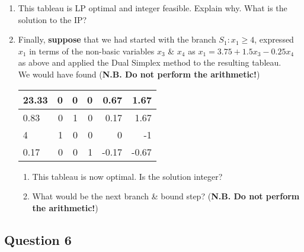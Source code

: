\documentclass[12pt]{article}
\begin{document}
\begin{itemize}
\begin{enumerate}[(i)]
\begin{enumerate}
				\item This tableau is LP optimal and integer feasible. Explain why. What is the solution to the IP?
				\item Finally, {\bf suppose} that we had started with the branch $S_1: x_1 \ge 4$, expressed  $x_1$ in terms of the non-basic variables $x_3$ \& $x_4$ as $x_1 =3.75+1.5 x_3 -0.25 x_4$ as above and applied the Dual Simplex method to the resulting tableau.\\
				\smallskip
				We would have found  ({\bf N.B. Do not perform the arithmetic!})
				\begin{center}
				\begin{tabular}[h]{|l|rrrrr|}\hline
					23.33       &      0&             0&             0&          0.67&          1.67\\ \hline
					0.83&             0&          1&             0&          0.17&          1.67\\
					4 &         1 &            0 &            0 &            0 &        -1\\
					0.17  &           0  &           0  &        1  &       -0.17  &       -0.67\\\hline
				\end{tabular}
				\end{center}
				\begin{enumerate}
					\item
					This tableau is now optimal. Is the solution integer?
					\item What would be the next branch \& bound step?  ({\bf N.B. Do not perform the arithmetic!})
				\end{enumerate}
					\end{enumerate}
		\end{enumerate}
			
	\end{itemize}

				\subsection*{Question 6}
				
				
\end{document}
